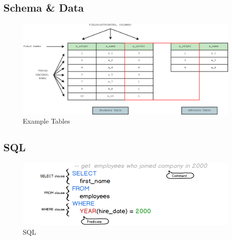 \documentclass{beamer}
\begin{document}

\subsection{Schema \& Data} %

\begin{frame}
  \begin{figure}
    \centering
    \includegraphics[width=1.05\linewidth]{schema}
    \caption{Example Tables}
  \end{figure}
\end{frame}

\subsection{SQL} %

\begin{frame}
  \begin{figure}
    \centering
    \includegraphics[width=1.05\linewidth]{sql_syntax}
    \caption{SQL}
  \end{figure}
\end{frame}
\end{document}
